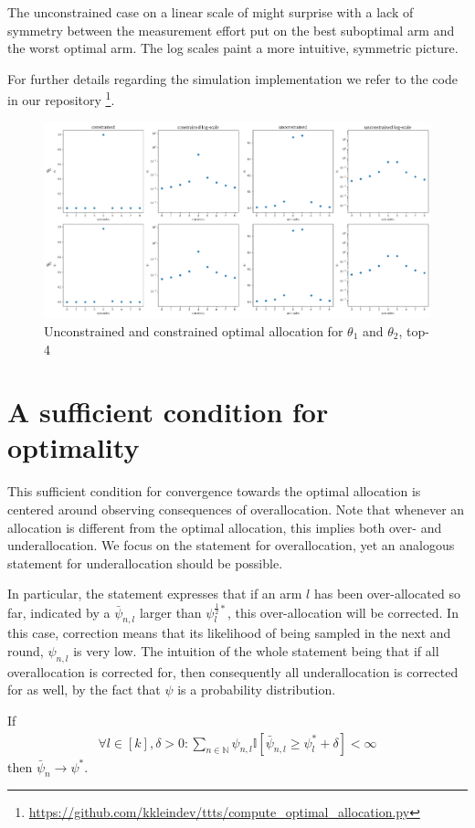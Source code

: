 The unconstrained case on a linear scale of  might
surprise with a lack of symmetry between the measurement effort put on the best
suboptimal arm and the worst optimal arm. The log scales paint a more intuitive,
symmetric picture.

For further details regarding the simulation implementation we refer to the code
in our repository
\footnote{\url{https://github.com/kkleindev/ttts/compute_optimal_allocation.py}}.

\begin{figure}[h]
  \centering
  \includegraphics[width=\textwidth]{optimal_allocation.png}
  \caption{Unconstrained and constrained optimal allocation for $\theta_1$ and $\theta_2$, top-4}
  \label{fig:optimal_allocation}
\end{figure}

\section{A sufficient condition for
    optimality}\label{section:optimality_sufficient_condition}
This sufficient condition for convergence towards the optimal allocation is
centered around observing consequences of overallocation. Note that whenever an
allocation is different from the optimal allocation, this implies both over- and
underallocation. We focus on the statement for overallocation, yet an analogous
statement for underallocation should be possible.

In particular, the statement expresses that if an arm $l$ has been
over-allocated so far, indicated by a $\bar{\psi}_{n, l}$ larger than
$\psi^{\frac{1}{2}*}_l$, this over-allocation will be corrected. In this case,
correction means that its likelihood of being sampled in the next and round,
$\psi_{n, l}$ is very low. The intuition of the whole statement being that if
all overallocation is corrected for, then consequently all underallocation is
corrected for as well, by the fact that $\psi$ is a probability distribution.
\begin{proposition}\label{proposition:optimality_sufficient_condition}
  If
  \begin{align}
    \forall l \in [k], \delta > 0: \sum_{n \in \mathbb{N}} \psi_{n, l}
        \mathbb{I}[\bar{\psi}_{n, l} \geq \psi^*_l + \delta] < \infty
        \label{eq:sufficient_condition}
  \end{align}
  then $\bar{\psi}_{n} \rightarrow \psi^*$.
\end{proposition}

